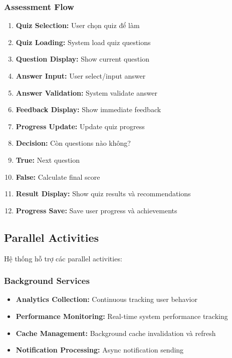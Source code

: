 \subsubsection{Assessment Flow}
\begin{enumerate}
    \item \textbf{Quiz Selection:} User chọn quiz để làm
    \item \textbf{Quiz Loading:} System load quiz questions
    \item \textbf{Question Display:} Show current question
    \item \textbf{Answer Input:} User select/input answer
    \item \textbf{Answer Validation:} System validate answer
    \item \textbf{Feedback Display:} Show immediate feedback
    \item \textbf{Progress Update:} Update quiz progress
    \item \textbf{Decision:} Còn questions nào không?
    \item \textbf{True:} Next question
    \item \textbf{False:} Calculate final score
    \item \textbf{Result Display:} Show quiz results và recommendations
    \item \textbf{Progress Save:} Save user progress và achievements
\end{enumerate}

\subsection{Parallel Activities}

Hệ thống hỗ trợ các parallel activities:

\subsubsection{Background Services}
\begin{itemize}
    \item \textbf{Analytics Collection:} Continuous tracking user behavior
    \item \textbf{Performance Monitoring:} Real-time system performance tracking
    \item \textbf{Cache Management:} Background cache invalidation và refresh
    \item \textbf{Notification Processing:} Async notification sending
\end{itemize}

